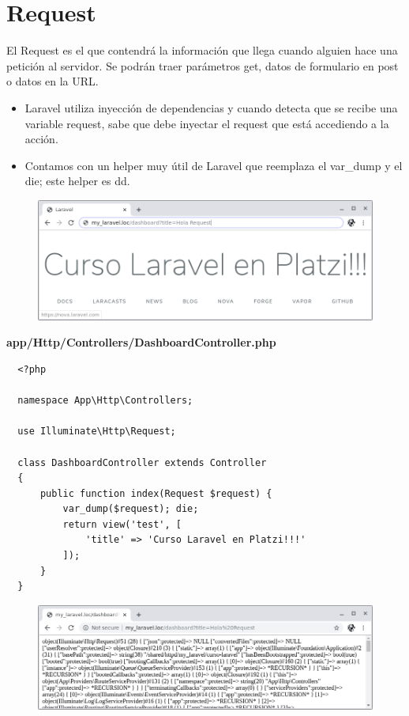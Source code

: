 \documentclass{article}
\begin{document}
\newpage

\section{Request}%

El Request es el que contendrá la información que llega cuando alguien hace una
petición al servidor. Se podrán traer parámetros get, datos de formulario en
post o datos en la URL.\\

\begin{itemize}
  \item Laravel utiliza inyección de dependencias y cuando detecta que se
    recibe una variable request, sabe que debe inyectar el request que está
    accediendo a la acción.
  \item Contamos con un helper muy útil de Laravel que reemplaza el var\_dump y
    el die; este helper es dd.
\end{itemize}

\begin{figure}[h!]
  \centering
  \includegraphics[scale=0.5]{./Pictures/015_request.png}
\end{figure}

\textbf{app/Http/Controllers/DashboardController.php}
\begin{verbatim}
  <?php

  namespace App\Http\Controllers;

  use Illuminate\Http\Request;

  class DashboardController extends Controller
  {
      public function index(Request $request) {
          var_dump($request); die;
          return view('test', [
              'title' => 'Curso Laravel en Platzi!!!'
          ]);
      }
  }
\end{verbatim}

\begin{figure}[h!]
  \centering
  \includegraphics[scale=0.5]{./Pictures/016_vardump_request.png}
\end{figure}
\end{document}

